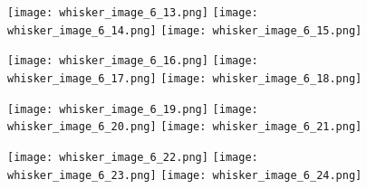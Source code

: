 \documentclass[12pt]{article}
\begin{document}
\begin{figure}
	\centerline{
		\texttt{[image: whisker\_image\_6\_13.png]}
		\texttt{[image: whisker\_image\_6\_14.png]}
		\texttt{[image: whisker\_image\_6\_15.png]}
	}
	\centerline{
		\texttt{[image: whisker\_image\_6\_16.png]}
		\texttt{[image: whisker\_image\_6\_17.png]}
		\texttt{[image: whisker\_image\_6\_18.png]}
	}
	\centerline{
		\texttt{[image: whisker\_image\_6\_19.png]}
		\texttt{[image: whisker\_image\_6\_20.png]}
		\texttt{[image: whisker\_image\_6\_21.png]}
	}
	\centerline{
		\texttt{[image: whisker\_image\_6\_22.png]}
		\texttt{[image: whisker\_image\_6\_23.png]}
		\texttt{[image: whisker\_image\_6\_24.png]}
	}
\end{figure}


\end{document}
